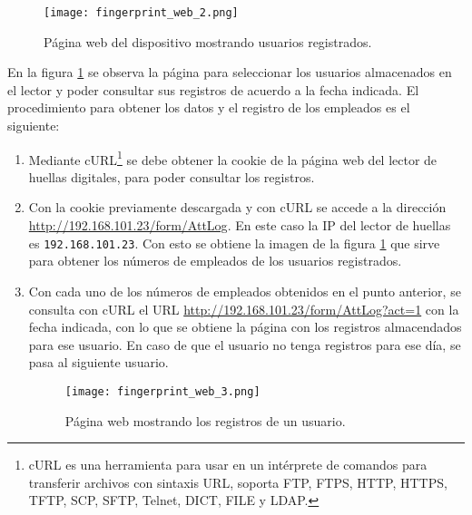 \begin{figure}[htb]
 \begin{center}
  \texttt{[image: fingerprint\_web\_2.png]}
 \end{center}
 \caption{Página web del dispositivo mostrando usuarios registrados.}
 \label{fig:finger_print_8}
\end{figure}

En la figura \ref{fig:finger_print_8} se observa la página para seleccionar los usuarios almacenados en el lector y poder consultar sus registros de acuerdo a la fecha indicada. El procedimiento para obtener los datos y el registro de los empleados es el siguiente:

\begin{enumerate}
 \item Mediante cURL\footnote{cURL es una herramienta para usar en un intérprete de comandos para transferir archivos con sintaxis URL, soporta FTP, FTPS, HTTP, HTTPS, TFTP, SCP, SFTP, Telnet, DICT, FILE y LDAP.} se debe obtener la cookie de la página web del lector de huellas digitales, para poder consultar los registros.
 \item Con la cookie previamente descargada y con cURL se accede a la dirección \url{http://192.168.101.23/form/AttLog}. En este caso la IP del lector de huellas es \texttt{192.168.101.23}. Con esto se obtiene la imagen de la figura \ref{fig:finger_print_8} que sirve para obtener los números de empleados de los usuarios registrados.
 \item Con cada uno de los números de empleados obtenidos en el punto anterior, se consulta con cURL el URL \url{http://192.168.101.23/form/AttLog?act=1} con la fecha indicada, con lo que se obtiene la página con los registros almacendados para ese usuario. En caso de que el usuario no tenga registros para ese día, se pasa al siguiente usuario.
 
 \begin{figure}[htb]
 \begin{center}
  \texttt{[image: fingerprint\_web\_3.png]}
 \end{center}
 \caption{Página web mostrando los registros de un usuario.}
 \label{fig:finger_print_9}
\end{figure}
 

\end{enumerate}
